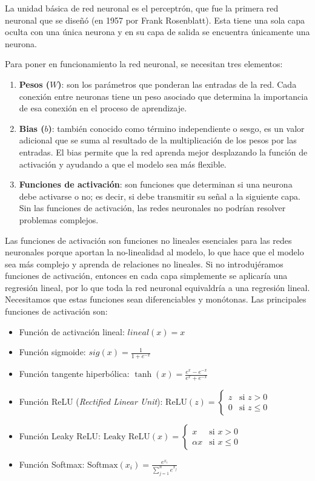 \documentclass[12pt,twoside]{article}
\begin{document}
La unidad básica de red neuronal es el perceptrón, que fue la primera red neuronal que se diseñó (en 1957 por Frank Rosenblatt). Esta tiene una sola capa oculta con una única neurona y en su capa de salida se encuentra únicamente una neurona.

Para poner en funcionamiento la red neuronal, se necesitan tres elementos: 

\begin{enumerate}
    \item \textbf{Pesos ($W$)}: son los parámetros que ponderan las entradas de la red. Cada conexión entre neuronas tiene un peso asociado que determina la importancia de esa conexión en el proceso de aprendizaje.
    \item \textbf{Bias ($b$)}: también conocido como término independiente o sesgo, es un valor adicional que se suma al resultado de la multiplicación de los pesos por las entradas. El bias permite que la red aprenda mejor desplazando la función de activación y ayudando a que el modelo sea más flexible.
    \item \textbf{Funciones de activación}: son funciones que determinan si una neurona debe activarse o no; es decir, si debe transmitir su señal a la siguiente capa. Sin las funciones de activación, las redes neuronales no podrían resolver problemas complejos.
\end{enumerate}

Las funciones de activación \cite{redes5} son funciones no lineales esenciales para las redes neuronales porque aportan la no-linealidad al modelo, lo que hace que el modelo sea más complejo y aprenda de relaciones no lineales. Si no introdujéramos funciones de activación, entonces en cada capa simplemente se aplicaría una regresión lineal, por lo que toda la red neuronal equivaldría a una regresión lineal. Necesitamos que estas funciones sean diferenciables y monótonas. Las principales funciones de activación son:

\begin{itemize}
    \item Función de activación lineal: $lineal(x) = x$
    \item Función sigmoide: $sig(x) = \frac{1}{1 + e^{-x}}$
    \item Función tangente hiperbólica: $\tanh(x) = \frac{e^{x} - e^{-x}}{e^{x} + e^{-x}}$
    \item Función ReLU (\textit{Rectified Linear Unit}): $\text{ReLU}(z) =
    \begin{cases} 
    z & \text{si } z > 0 \\
    0 & \text{si } z \leq 0
    \end{cases}$
    \item Función Leaky ReLU: $\text{Leaky ReLU}(x) = \begin{cases} 
    x & \text{si } x > 0 \\
    \alpha x & \text{si } x \leq 0 
    \end{cases}$
    \item Función Softmax: $\text{Softmax}(x_i) = \frac{e^{x_i}}{\sum_{j=1}^{n} e^{x_j}}$
\end{itemize}
\end{document}
